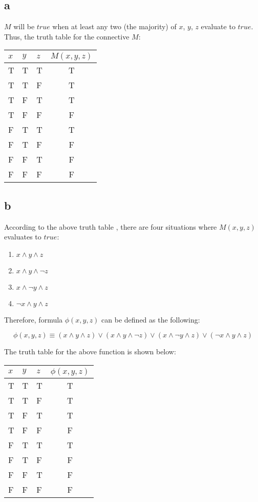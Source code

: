 \subsection{a}
\(M\) will be \(true\) when at least any two (the majority) of \(x\), \(y\), \(z\) evaluate to \(true\). Thus, the truth table for the connective \(M\):
\begin{center}
\begin{tabular}{|l|l|l|c|}
  \hline
  \(x\) & \(y\) & \(z\) & \(M(x,y,z)\) \\
  \hline
  T & T & T & T \\
  T & T & F & T \\
  T & F & T & T \\
  T & F & F & F \\
  F & T & T & T \\
  F & T & F & F \\
  F & F & T & F \\
  F & F & F & F \\
  \hline
\end{tabular}
\end{center}

\subsection{b}
According to the above truth table , there are four situations where \(M(x,y,z)\) evaluates to \(true\):
\begin{enumerate}
\item \(x \land y \land z\)
\item \(x \land y \land \neg z\)
\item \(x \land \neg y \land z\)
\item \(\neg x \land y \land z\)
\end{enumerate}
Therefore, formula \(\phi(x,y,z)\) can be defined as the following:

\[\phi(x,y,z) \equiv (x \land y \land z) \lor (x \land y \land \neg z) \lor (x \land \neg y \land z) \lor (\neg x \land y \land z)\]

The truth table for the above function is shown below:

\begin{center}
\begin{tabular}{|l|l|l|c|}
  \hline
  \(x\) & \(y\) & \(z\) & \(\phi(x,y,z)\) \\
  \hline
  T & T & T & T \\
  T & T & F & T \\
  T & F & T & T \\
  T & F & F & F \\
  F & T & T & T \\
  F & T & F & F \\
  F & F & T & F \\
  F & F & F & F \\
  \hline
\end{tabular}
\end{center}

